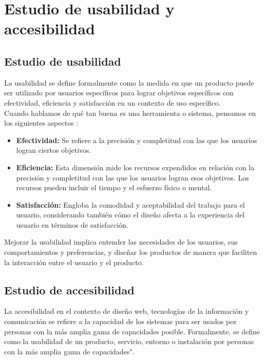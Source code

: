 \newpage

\section{Estudio de usabilidad y accesibilidad}

\subsection{Estudio de usabilidad}

La usabilidad se define formalmente como la medida en que un producto puede ser utilizado por usuarios específicos para lograr objetivos específicos con efectividad, eficiencia y satisfacción en un contexto de uso específico. \cite{iso} \\ 

Cuando hablamos de qué tan buena es una herramienta o sistema, pensamos en los siguientes aspectos \cite{fernandez2018usabilidad}:

\begin{itemize}
	\item \textbf{Efectividad: } Se refiere a la precisión y completitud con las que los usuarios logran ciertos objetivos.
	\item \textbf{Eficiencia: } Esta dimensión mide los recursos expendidos en relación con la precisión y completitud con las que los usuarios logran esos objetivos. Los recursos pueden incluir el tiempo y el esfuerzo físico o mental.
	\item \textbf{Satisfacción: } Engloba la comodidad y aceptabilidad del trabajo para el usuario, considerando también cómo el diseño afecta a la experiencia del usuario en términos de satisfacción.	
\end{itemize}

Mejorar la usabilidad implica entender las necesidades de los usuarios, sus comportamientos y preferencias, y diseñar los productos de manera que faciliten la interacción entre el usuario y el producto.

\subsection{Estudio de accesibilidad}

La accesibilidad en el contexto de diseño web, tecnologías de la información y comunicación se refiere a la capacidad de los sistemas para ser usados por personas con la más amplia gama de capacidades posible. Formalmente, se define como la usabilidad de un producto, servicio, entorno o instalación por personas con la más amplia gama de capacidades". \cite{accesibilidad} \\

